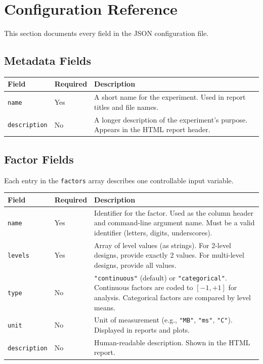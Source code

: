 \documentclass[11pt]{book}
\begin{document}
\section{Configuration Reference}

This section documents every field in the JSON configuration file.

\subsection{Metadata Fields}

\begin{center}
\begin{tabular}{llp{5.5cm}}
\toprule
Field & Required & Description \\
\midrule
\texttt{name} & Yes & A short name for the experiment. Used in report titles and file names. \\
\texttt{description} & No & A longer description of the experiment's purpose. Appears in the HTML report header. \\
\bottomrule
\end{tabular}
\end{center}

\subsection{Factor Fields}

Each entry in the \texttt{factors} array describes one controllable input variable.

\begin{center}
\begin{tabular}{llp{5.5cm}}
\toprule
Field & Required & Description \\
\midrule
\texttt{name} & Yes & Identifier for the factor. Used as the column header and command-line argument name. Must be a valid identifier (letters, digits, underscores). \\
\texttt{levels} & Yes & Array of level values (as strings). For 2-level designs, provide exactly 2 values. For multi-level designs, provide all values. \\
\texttt{type} & No & \texttt{"continuous"} (default) or \texttt{"categorical"}. Continuous factors are coded to $[-1, +1]$ for analysis. Categorical factors are compared by level means. \\
\texttt{unit} & No & Unit of measurement (e.g., \texttt{"MB"}, \texttt{"ms"}, \texttt{"C"}). Displayed in reports and plots. \\
\texttt{description} & No & Human-readable description. Shown in the HTML report. \\
\bottomrule
\end{tabular}
\end{center}
\end{document}
